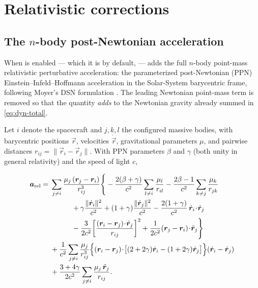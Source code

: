 \section{Relativistic corrections}
\label{sec:dyn-relativity}

\subsection{The \texorpdfstring{$n$}{n}-body post-Newtonian acceleration}

When  is enabled --- which it is by default,
 ---  adds the full $n$-body
point-mass relativistic perturbative acceleration: the parameterized
post-Newtonian (PPN) Einstein--Infeld--Hoffmann acceleration in the
Solar-System barycentric frame, following Moyer's DSN formulation
\citep[Eq.~(4-26)]{moyer2000}. The leading Newtonian point-mass term is removed
so that the quantity \emph{adds} to the Newtonian gravity already summed in
\cref{eq:dyn-total}.

Let $i$ denote the spacecraft and $j,k,l$ the configured massive bodies, with
barycentric positions $\vec{r}$, velocities $\dot{\vec{r}}$, gravitational
parameters $\mu$, and pairwise distances
$r_{ij}=\lVert\vec{r}_i-\vec{r}_j\rVert$. With PPN parameters $\beta$ and
$\gamma$ (both unity in general relativity) and the speed of light $c$,

\begin{equation}
  \label{eq:dyn-moyer}
  \begin{aligned}
    \vec{a}_\mathrm{rel}
    ={}& \sum_{j\ne i}\frac{\mu_j\,(\vec{r}_j-\vec{r}_i)}{r_{ij}^3}
      \Bigg\{
        -\frac{2(\beta+\gamma)}{c^{2}}\sum_{l\ne i}\frac{\mu_l}{r_{il}}
        -\frac{2\beta-1}{c^{2}}\sum_{k\ne j}\frac{\mu_k}{r_{jk}} \\
    &\qquad\quad
        +\gamma\frac{\lVert\dot{\vec{r}}_i\rVert^{2}}{c^{2}}
        +(1+\gamma)\frac{\lVert\dot{\vec{r}}_j\rVert^{2}}{c^{2}}
        -\frac{2(1+\gamma)}{c^{2}}\,\dot{\vec{r}}_i\!\cdot\!\dot{\vec{r}}_j \\
    &\qquad\quad
        -\frac{3}{2c^{2}}\!\left[\frac{(\vec{r}_i-\vec{r}_j)\!\cdot\!\dot{\vec{r}}_j}{r_{ij}}\right]^{2}
        +\frac{1}{2c^{2}}(\vec{r}_j-\vec{r}_i)\!\cdot\!\ddot{\vec{r}}_j
      \Bigg\} \\
    &+\frac{1}{c^{2}}\sum_{j\ne i}\frac{\mu_j}{r_{ij}^{3}}
      \Bigl\{(\vec{r}_i-\vec{r}_j)\!\cdot\!\bigl[(2+2\gamma)\dot{\vec{r}}_i-(1+2\gamma)\dot{\vec{r}}_j\bigr]\Bigr\}
      (\dot{\vec{r}}_i-\dot{\vec{r}}_j) \\
    &+\frac{3+4\gamma}{2c^{2}}\sum_{j\ne i}\frac{\mu_j\,\ddot{\vec{r}}_j}{r_{ij}} .
  \end{aligned}
\end{equation}

